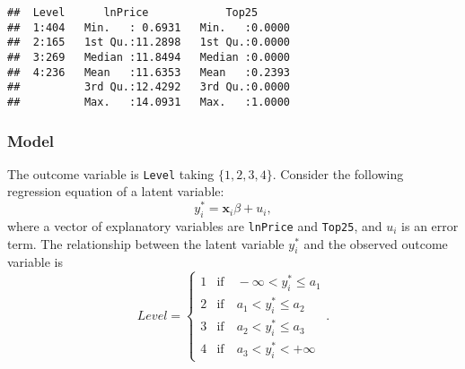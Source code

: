 \documentclass[
  12pt,
]{article}
\newenvironment{Shaded}{\begin{snugshade}}{\end{snugshade}}
\newcommand{\DataTypeTok}[1]{\textcolor[rgb]{0.13,0.29,0.53}{#1}}
\newcommand{\DecValTok}[1]{\textcolor[rgb]{0.00,0.00,0.81}{#1}}
\newcommand{\KeywordTok}[1]{\textcolor[rgb]{0.13,0.29,0.53}{\textbf{#1}}}
\newcommand{\NormalTok}[1]{#1}
\newcommand{\OperatorTok}[1]{\textcolor[rgb]{0.81,0.36,0.00}{\textbf{#1}}}
\newcommand{\OtherTok}[1]{\textcolor[rgb]{0.56,0.35,0.01}{#1}}
\newcommand{\StringTok}[1]{\textcolor[rgb]{0.31,0.60,0.02}{#1}}
\begin{document}
\begin{Shaded}
\end{Shaded}

\begin{verbatim}
##  Level      lnPrice            Top25       
##  1:404   Min.   : 0.6931   Min.   :0.0000  
##  2:165   1st Qu.:11.2898   1st Qu.:0.0000  
##  3:269   Median :11.8494   Median :0.0000  
##  4:236   Mean   :11.6353   Mean   :0.2393  
##          3rd Qu.:12.4292   3rd Qu.:0.0000  
##          Max.   :14.0931   Max.   :1.0000
\end{verbatim}

\hypertarget{model}{%
\subsubsection{Model}\label{model}}

The outcome variable is \texttt{Level} taking \(\{1, 2, 3, 4\}\).
Consider the following regression equation of a latent variable:
\begin{equation*}
  y_i^* = \mathbf{x}_i \beta + u_i,
\end{equation*}
where a vector of explanatory variables are \texttt{lnPrice} and \texttt{Top25}, and \(u_i\) is an error term.
The relationship between the latent variable \(y_i^*\) and the observed outcome variable is
\begin{equation*}
  Level =
  \begin{cases}
    1 &\text{if}\quad -\infty < y_i^* \le a_1  \\
    2 &\text{if}\quad a_1 < y_i^* \le a_2 \\
    3 &\text{if}\quad a_2 < y_i^* \le a_3 \\
    4 &\text{if}\quad a_3 < y_i^* < +\infty
  \end{cases}.
\end{equation*}
\end{document}
